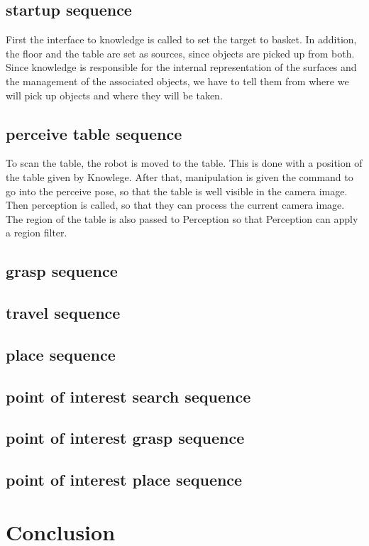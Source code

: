 \documentclass[main.tex]{subfiles}
\begin{document}
		\subsection{startup sequence}
	First the interface to knowledge is called to set the target to basket. In addition, the floor and the table are set as sources, since objects are picked up from both. Since knowledge is responsible for the internal representation of the surfaces and the management of the associated objects, we have to tell them from where we will pick up objects and where they will be taken. 

	\subsection{perceive table sequence}
	To scan the table, the robot is moved to the table. This is done with a position of the table given by Knowlege. After that, manipulation is given the command to go into the perceive pose, so that the table is well visible in the camera image. Then perception is called, so that they can process the current camera image. The region of the table is also passed to Perception so that Perception can apply a region filter.

	\subsection{grasp sequence}
	\subsection{travel sequence}
	\subsection{place sequence}
	\subsection{point of interest search sequence}
	\subsection{point of interest grasp sequence}
	\subsection{point of interest place sequence}


		
		\section{Conclusion}
		
		
	\endgroup
\end{document}
